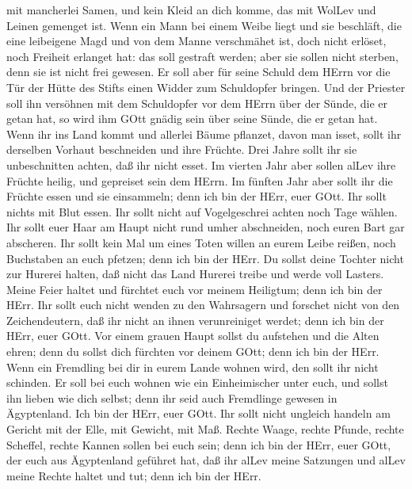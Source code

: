 mit mancherlei Samen, und kein Kleid an dich komme, das mit WolLev und
Leinen gemenget ist.  Wenn ein Mann bei einem Weibe liegt
und sie beschläft, die eine leibeigene Magd und von dem Manne
verschmähet ist, doch nicht erlöset, noch Freiheit erlanget hat: das
soll gestraft werden; aber sie sollen nicht sterben, denn sie ist nicht
frei gewesen.  Er soll aber für seine Schuld dem HErrn vor
die Tür der Hütte des Stifts einen Widder zum Schuldopfer bringen.
 Und der Priester soll ihn versöhnen mit dem Schuldopfer
vor dem HErrn über der Sünde, die er getan hat, so wird ihm GOtt gnädig
sein über seine Sünde, die er getan hat.  Wenn ihr ins Land
kommt und allerlei Bäume pflanzet, davon man isset, sollt ihr derselben
Vorhaut beschneiden und ihre Früchte. Drei Jahre sollt ihr sie
unbeschnitten achten, daß ihr nicht esset.  Im vierten Jahr
aber sollen alLev ihre Früchte heilig, und gepreiset sein dem HErrn.
 Im fünften Jahr aber sollt ihr die Früchte essen und sie
einsammeln; denn ich bin der HErr, euer GOtt.  Ihr sollt
nichts mit Blut essen. Ihr sollt nicht auf Vogelgeschrei achten noch
Tage wählen.  Ihr sollt euer Haar am Haupt nicht rund umher
abschneiden, noch euren Bart gar abscheren.  Ihr sollt kein
Mal um eines Toten willen an eurem Leibe reißen, noch Buchstaben an euch
pfetzen; denn ich bin der HErr.  Du sollst deine Tochter
nicht zur Hurerei halten, daß nicht das Land Hurerei treibe und werde
voll Lasters.  Meine Feier haltet und fürchtet euch vor
meinem Heiligtum; denn ich bin der HErr.  Ihr sollt euch
nicht wenden zu den Wahrsagern und forschet nicht von den
Zeichendeutern, daß ihr nicht an ihnen verunreiniget werdet; denn ich
bin der HErr, euer GOtt.  Vor einem grauen Haupt sollst du
aufstehen und die Alten ehren; denn du sollst dich fürchten vor deinem
GOtt; denn ich bin der HErr.  Wenn ein Fremdling bei dir in
eurem Lande wohnen wird, den sollt ihr nicht schinden.  Er
soll bei euch wohnen wie ein Einheimischer unter euch, und sollst ihn
lieben wie dich selbst; denn ihr seid auch Fremdlinge gewesen in
Ägyptenland. Ich bin der HErr, euer GOtt.  Ihr sollt nicht
ungleich handeln am Gericht mit der Elle, mit Gewicht, mit Maß.
 Rechte Waage, rechte Pfunde, rechte Scheffel, rechte
Kannen sollen bei euch sein; denn ich bin der HErr, euer GOtt, der euch
aus Ägyptenland geführet hat,  daß ihr alLev meine
Satzungen und alLev meine Rechte haltet und tut; denn ich bin der HErr.

